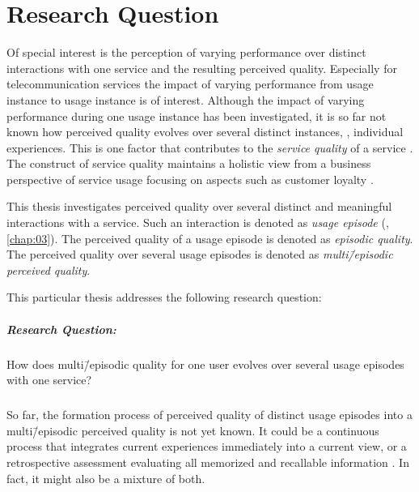 \section{Research Question}
Of special interest is the perception of varying performance over distinct interactions with one service and the resulting perceived quality.
Especially for telecommunication services the impact of varying performance from usage instance to usage instance is of interest.
Although the impact of varying performance during one usage instance has been investigated, it is so far not known how perceived quality evolves over several distinct instances, \ie, individual experiences.
This is one factor that contributes to the \emph{service quality} of a service \citep[][]{berry_quality_1985, zeithaml_behavioral_1996}.
The construct of service quality maintains a holistic view from a business perspective of service usage focusing on aspects such as customer loyalty \citep{parasuraman_conceptual_1985}.

This thesis investigates perceived quality over several distinct and meaningful interactions with a service.
Such an interaction is denoted as \emph{usage episode} (\cf, \autoref{chap:03}).
The perceived quality of a usage episode is denoted as \emph{episodic quality}.
The perceived quality over several usage episodes is denoted as \emph{multi\=/episodic perceived quality}.

This particular thesis addresses the following research question: 
\subparagraph*{Research Question:}
How does multi\=/episodic quality for one user evolves over several usage episodes with one service?

\subparagraph*{}
So far, the formation process of perceived quality of distinct usage episodes into a multi\=/episodic perceived quality is not yet known.
It could be a continuous process that integrates current experiences immediately into a current view, or a retrospective assessment evaluating all memorized and recallable information \citep[][]{hogarth_order_1992}. 
In fact, it might also be a mixture of both.


